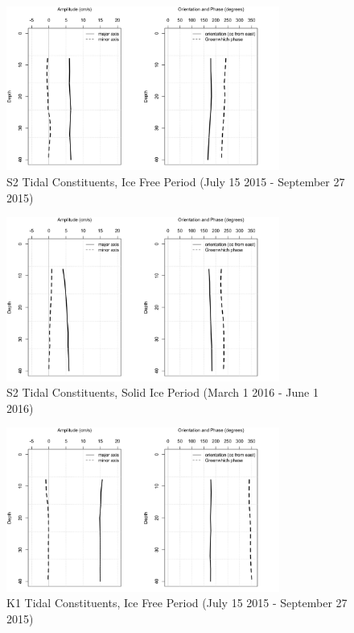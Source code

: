 \documentclass[12pt]{dforeport}
\begin{document}
\begin{figure}  
\centering
\includegraphics[width = 0.8\textwidth]{./figures/55_S2TC_if_2015.png}
\caption[S2 Tidal Constituents, Ice free, 2015]{S2 Tidal Constituents, Ice Free Period (July 15 2015 - September 27 2015)}
\label{f:s2_if_2015}
\end{figure}

\begin{figure}  
\centering
\includegraphics[width = 0.8\textwidth]{./figures/56_S2TC_si_2015.png}
\caption[S2 Tidal Constituents, Solid Ice, 2015]{S2 Tidal Constituents, Solid Ice Period (March 1 2016 - June 1 2016)}
\label{f:s2_si_2015}
\end{figure}


\begin{figure}  
\centering
\includegraphics[width = 0.8\textwidth]{./figures/57_K1TC_if_2015.png}
\caption[K1 Tidal Constituents, Ice free, 2015]{K1 Tidal Constituents, Ice Free Period (July 15 2015 - September 27 2015)}
\label{f:k1_if_2015}
\end{figure}
\end{document}
